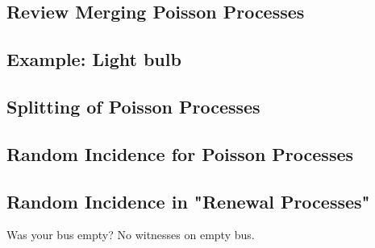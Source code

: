 \subsection{Review Merging Poisson Processes}


\subsection{Example: Light bulb}


\subsection{Splitting of Poisson Processes}


\subsection{Random Incidence for Poisson Processes}

\subsection{Random Incidence in "Renewal Processes"}

Was your bus empty? No witnesses on empty bus.